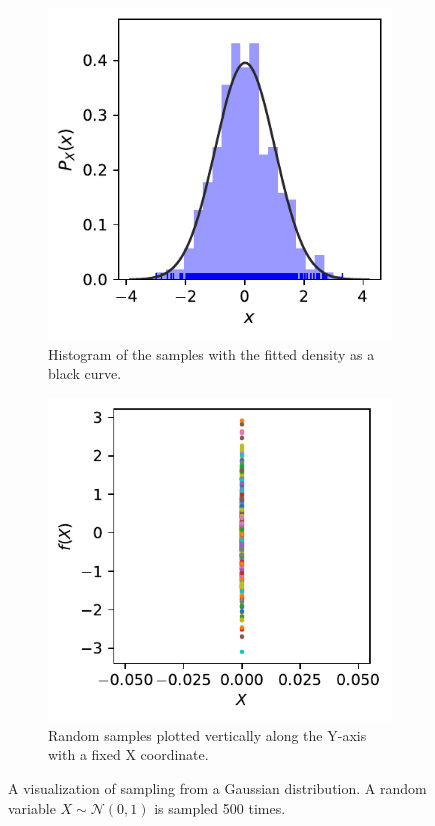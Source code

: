 \begin{figure}
    \centering
    \begin{subfigure}{0.49\textwidth}
        \centering
        \includegraphics[scale=0.8]{img/1d_gaussian.pdf}
        \caption{Histogram of the samples with the fitted density as a black curve.}
    \end{subfigure}
    \hfill
    \begin{subfigure}{0.49\textwidth}
        \centering
        \includegraphics[scale=0.8]{img/1d_gaussian_projected.pdf}
        \caption{Random samples plotted vertically along the Y-axis with a fixed X coordinate.}
    \end{subfigure}
    \caption{A visualization of sampling from a Gaussian distribution. A random variable $X \sim \mathcal{N}(0, 1)$ is sampled 500 times.}
    \label{fig:1}
\end{figure}

